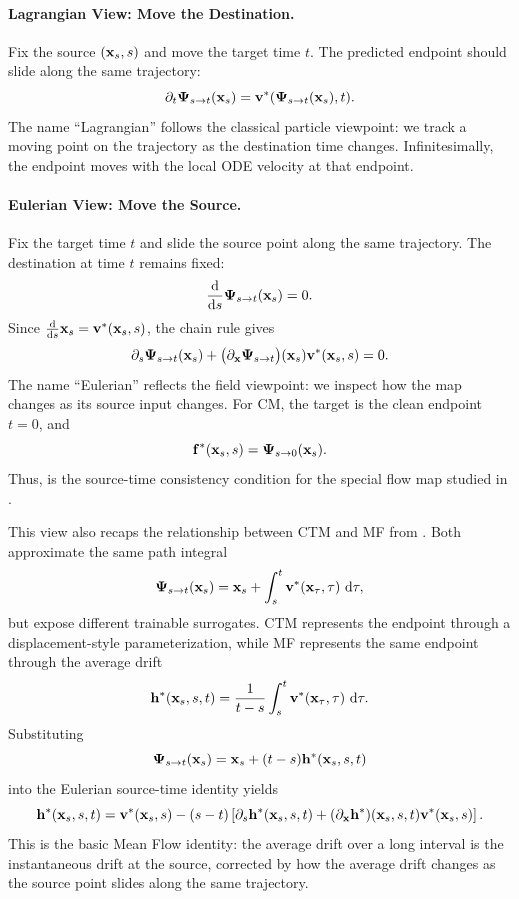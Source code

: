 \paragraph{Lagrangian View: Move the Destination.}
Fix the source $({\mathbf{x}}_s,s)$ and move the target time $t$.  The predicted
endpoint should slide along the same trajectory:
\[
\partial_t {\bm{\Psi}}_{s\to t}({\mathbf{x}}_s)
=
{\mathbf{v}}^*({\bm{\Psi}}_{s\to t}({\mathbf{x}}_s),t).
\]
The name ``Lagrangian'' follows the classical particle viewpoint: we track a
moving point on the trajectory as the destination time changes.  Infinitesimally,
the endpoint moves with the local ODE velocity at that endpoint.

\paragraph{Eulerian View: Move the Source.}
Fix the target time $t$ and slide the source point along the same trajectory.
The destination at time $t$ remains fixed:
\[
\frac{\mathop{}\!\mathrm{d}}{\mathop{}\!\mathrm{d} s}{\bm{\Psi}}_{s\to t}({\mathbf{x}}_s)=0.
\]
Since $\frac{\mathop{}\!\mathrm{d}}{\mathop{}\!\mathrm{d} s}{\mathbf{x}}_s={\mathbf{v}}^*({\mathbf{x}}_s,s)$, the chain rule gives
\[
\partial_s{\bm{\Psi}}_{s\to t}({\mathbf{x}}_s)
+
\big(\partial_{{\mathbf{x}}}{\bm{\Psi}}_{s\to t}\big)({\mathbf{x}}_s){\mathbf{v}}^*({\mathbf{x}}_s,s)
=
0.
\]
The name ``Eulerian'' reflects the field viewpoint: we inspect how the map
changes as its source input changes.  For CM, the target is the clean endpoint
$t=0$, and
\[
    {\mathbf{f}}^*({\mathbf{x}}_s,s)={\bm{\Psi}}_{s\to0}({\mathbf{x}}_s).
\]
Thus,  is the source-time consistency condition
for the special flow map studied in .



This view also recaps the relationship between CTM and MF from
.  Both approximate the same path integral
\[
{\bm{\Psi}}_{s\to t}({\mathbf{x}}_s)
=
{\mathbf{x}}_s+\int_s^t{\mathbf{v}}^*({\mathbf{x}}_\tau,\tau)\,\mathop{}\!\mathrm{d}\tau,
\]
but expose different trainable surrogates.  CTM represents the endpoint through
a displacement-style parameterization, while MF represents the same endpoint
through the average drift
\[
{\mathbf{h}}^*({\mathbf{x}}_s,s,t)
=
\frac{1}{t-s}\int_s^t{\mathbf{v}}^*({\mathbf{x}}_\tau,\tau)\,\mathop{}\!\mathrm{d}\tau.
\]
Substituting
\[
{\bm{\Psi}}_{s\to t}({\mathbf{x}}_s)={\mathbf{x}}_s+(t-s){\mathbf{h}}^*({\mathbf{x}}_s,s,t)
\]
into the Eulerian source-time identity yields
\[
{\mathbf{h}}^*({\mathbf{x}}_s,s,t)
=
{\mathbf{v}}^*({\mathbf{x}}_s,s)
-
(s-t)
\left[
\partial_s{\mathbf{h}}^*({\mathbf{x}}_s,s,t)
+
(\partial_{{\mathbf{x}}}{\mathbf{h}}^*)({\mathbf{x}}_s,s,t){\mathbf{v}}^*({\mathbf{x}}_s,s)
\right].
\]
This is the basic Mean Flow identity: the average drift over a long interval is
the instantaneous drift at the source, corrected by how the average drift
changes as the source point slides along the same trajectory.

